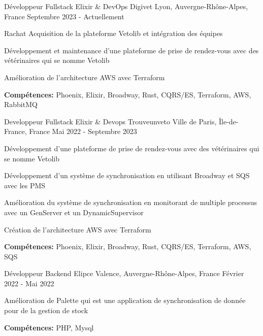 
\begin{cventries}
  \cventry
    {Développeur Fullstack Elixir \& DevOps}
    {Digivet}
    {Lyon, Auvergne-Rhône-Alpes, France}
    {Septembre 2023 - Actuellement}
    {
      \begin{cvitems}
        \item {Rachat Acquisition de la plateforme Vetolib et intégration des équipes}
        \item {Développement et maintenance d'une plateforme de prise de rendez-vous avec des vétérinaires qui se nomme Vetolib}
        \item {Amélioration de l'architecture AWS avec Terraform}
        \item {\textbf{Compétences:} Phoenix, Elixir, Broadway, Rust, CQRS/ES, Terraform, AWS, RabbitMQ}
      \end{cvitems}
    }

  \cventry
    {Developpeur Fullstack Elixir \& Devops}
    {Trouveunveto}
    {Ville de Paris, Île-de-France, France}
    {Mai 2022 - Septembre 2023}
    {
      \begin{cvitems}
        \item {Développement d'une plateforme de prise de rendez-vous avec des vétérinaires qui se nomme Vetolib}
        \item {Développement d'un système de synchronisation en utilisant Broadway et SQS avec les PMS}
        \item {Amélioration du système de synchronisation en monitorant de multiple processus avec un GenServer et un DynamicSupervisor}
        \item {Création de l'architecture AWS avec Terraform}
        \item {\textbf{Compétences:} Phoenix, Elixir, Broadway, Rust, CQRS/ES, Terraform, AWS, SQS}
      \end{cvitems}
    }

  \cventry
    {Développeur Backend}
    {Elipce}
    {Valence, Auvergne-Rhône-Alpes, France}
    {Février 2022 - Mai 2022}
    {
      \begin{cvitems}
        \item {Amélioration de Palette qui est une application de synchronisation de donnée pour de la gestion de stock}
        \item {\textbf{Compétences:} PHP, Mysql}
      \end{cvitems}
    }


\end{cventries}
